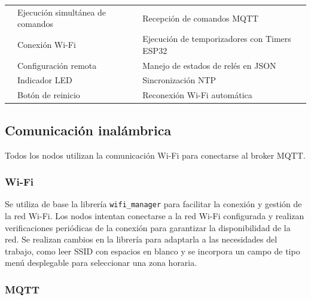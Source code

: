 \begin{table}[H]
\begin{tabular}{p{1.7cm}p{5.3cm}p{4.9cm}}
                                                          & Ejecución simultánea de comandos                                              & Recepción de comandos MQTT                     \\
                                                          & Conexión Wi-Fi                                                                & Ejecución de temporizadores con Timers ESP32   \\
                                                          & Configuración remota                                                          & Manejo de estados de relés en JSON             \\
                                                          & Indicador LED                                                                 & Sincronización NTP                             \\
                                                          & Botón de reinicio                                                             & Reconexión Wi-Fi automática                    \\
        \hline
    \end{tabular}
    \label{tab:nodos_iot}
\end{table}

\subsection{Comunicación inalámbrica}

Todos los nodos utilizan la comunicación Wi-Fi para conectarse al broker MQTT.

\subsubsection{Wi-Fi}

Se utiliza de base la librería \texttt{wifi\_manager}
\cite{MicroPythonWifiManager} para facilitar la conexión y gestión de la red
Wi-Fi. Los nodos intentan conectarse a la red Wi-Fi configurada y realizan
verificaciones periódicas de la conexión para garantizar la disponibilidad de
la red. Se realizan cambios en la librería para adaptarla a las necesidades del
trabajo, como leer SSID con espacios en blanco y se incorpora un campo de tipo
menú desplegable para seleccionar una zona horaria.

\subsubsection{MQTT}

